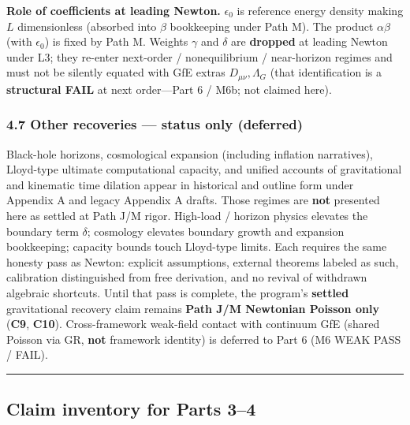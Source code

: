 \documentclass[
  11pt,
]{article}
\newcounter{none} %
\begin{document}
\textbf{Role of coefficients at leading Newton.} \(\epsilon_0\) is reference energy density making \(L\) dimensionless (absorbed into \(\beta\) bookkeeping under Path M). The product \(\alpha\beta\) (with \(\epsilon_0\)) is fixed by Path M. Weights \(\gamma\) and \(\delta\) are \textbf{dropped} at leading Newton under L3; they re-enter next-order / nonequilibrium / near-horizon regimes and must not be silently equated with GfE extras \(D_{\mu\nu},\Lambda_G\) (that identification is a \textbf{structural FAIL} at next order---Part 6 / M6b; not claimed here).

\subsubsection{4.7 Other recoveries --- status only (deferred)}\label{other-recoveries-status-only-deferred}

Black-hole horizons, cosmological expansion (including inflation narratives), Lloyd-type ultimate computational capacity, and unified accounts of gravitational and kinematic time dilation appear in historical and outline form under Appendix A and legacy Appendix A drafts. Those regimes are \textbf{not} presented here as settled at Path J/M rigor. High-load / horizon physics elevates the boundary term \(\delta\); cosmology elevates boundary growth and expansion bookkeeping; capacity bounds touch Lloyd-type limits. Each requires the same honesty pass as Newton: explicit assumptions, external theorems labeled as such, calibration distinguished from free derivation, and no revival of withdrawn algebraic shortcuts. Until that pass is complete, the program's \textbf{settled} gravitational recovery claim remains \textbf{Path J/M Newtonian Poisson only} (\textbf{C9}, \textbf{C10}). Cross-framework weak-field contact with continuum GfE (shared Poisson via GR, \textbf{not} framework identity) is deferred to Part 6 (M6 WEAK PASS / FAIL).

\begin{center}\rule{0.5\linewidth}{0.5pt}\end{center}

\subsection{Claim inventory for Parts 3--4}\label{claim-inventory-for-parts-34}
\end{document}
